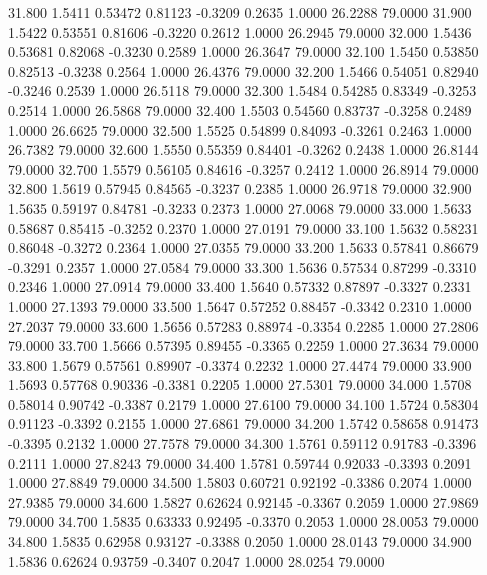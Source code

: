   31.800   1.5411   0.53472   0.81123  -0.3209   0.2635   1.0000  26.2288  79.0000
  31.900   1.5422   0.53551   0.81606  -0.3220   0.2612   1.0000  26.2945  79.0000
  32.000   1.5436   0.53681   0.82068  -0.3230   0.2589   1.0000  26.3647  79.0000
  32.100   1.5450   0.53850   0.82513  -0.3238   0.2564   1.0000  26.4376  79.0000
  32.200   1.5466   0.54051   0.82940  -0.3246   0.2539   1.0000  26.5118  79.0000
  32.300   1.5484   0.54285   0.83349  -0.3253   0.2514   1.0000  26.5868  79.0000
  32.400   1.5503   0.54560   0.83737  -0.3258   0.2489   1.0000  26.6625  79.0000
  32.500   1.5525   0.54899   0.84093  -0.3261   0.2463   1.0000  26.7382  79.0000
  32.600   1.5550   0.55359   0.84401  -0.3262   0.2438   1.0000  26.8144  79.0000
  32.700   1.5579   0.56105   0.84616  -0.3257   0.2412   1.0000  26.8914  79.0000
  32.800   1.5619   0.57945   0.84565  -0.3237   0.2385   1.0000  26.9718  79.0000
  32.900   1.5635   0.59197   0.84781  -0.3233   0.2373   1.0000  27.0068  79.0000
  33.000   1.5633   0.58687   0.85415  -0.3252   0.2370   1.0000  27.0191  79.0000
  33.100   1.5632   0.58231   0.86048  -0.3272   0.2364   1.0000  27.0355  79.0000
  33.200   1.5633   0.57841   0.86679  -0.3291   0.2357   1.0000  27.0584  79.0000
  33.300   1.5636   0.57534   0.87299  -0.3310   0.2346   1.0000  27.0914  79.0000
  33.400   1.5640   0.57332   0.87897  -0.3327   0.2331   1.0000  27.1393  79.0000
  33.500   1.5647   0.57252   0.88457  -0.3342   0.2310   1.0000  27.2037  79.0000
  33.600   1.5656   0.57283   0.88974  -0.3354   0.2285   1.0000  27.2806  79.0000
  33.700   1.5666   0.57395   0.89455  -0.3365   0.2259   1.0000  27.3634  79.0000
  33.800   1.5679   0.57561   0.89907  -0.3374   0.2232   1.0000  27.4474  79.0000
  33.900   1.5693   0.57768   0.90336  -0.3381   0.2205   1.0000  27.5301  79.0000
  34.000   1.5708   0.58014   0.90742  -0.3387   0.2179   1.0000  27.6100  79.0000
  34.100   1.5724   0.58304   0.91123  -0.3392   0.2155   1.0000  27.6861  79.0000
  34.200   1.5742   0.58658   0.91473  -0.3395   0.2132   1.0000  27.7578  79.0000
  34.300   1.5761   0.59112   0.91783  -0.3396   0.2111   1.0000  27.8243  79.0000
  34.400   1.5781   0.59744   0.92033  -0.3393   0.2091   1.0000  27.8849  79.0000
  34.500   1.5803   0.60721   0.92192  -0.3386   0.2074   1.0000  27.9385  79.0000
  34.600   1.5827   0.62624   0.92145  -0.3367   0.2059   1.0000  27.9869  79.0000
  34.700   1.5835   0.63333   0.92495  -0.3370   0.2053   1.0000  28.0053  79.0000
  34.800   1.5835   0.62958   0.93127  -0.3388   0.2050   1.0000  28.0143  79.0000
  34.900   1.5836   0.62624   0.93759  -0.3407   0.2047   1.0000  28.0254  79.0000
